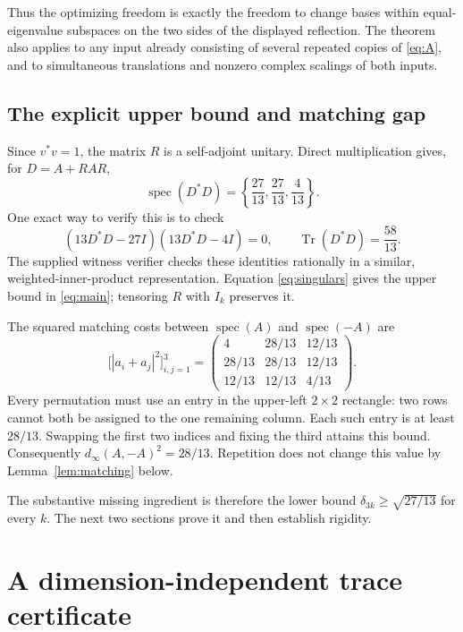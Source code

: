 \documentclass[11pt]{article}
\theoremstyle{definition}\newtheorem{definition}[theorem]{Definition}
\theoremstyle{remark}\newtheorem{remark}[theorem]{Remark}
\newcommand{\Tr}{\operatorname{Tr}}
\newcommand{\spec}{\operatorname{spec}}
\newcommand{\dd}{\delta}
\newcommand{\dm}{d_\infty}
\begin{document}
Thus the optimizing freedom is exactly the freedom to change bases within equal-eigenvalue subspaces on the two sides of the displayed reflection. The theorem also applies to any input already consisting of several repeated copies of \eqref{eq:A}, and to simultaneous translations and nonzero complex scalings of both inputs.

\subsection{The explicit upper bound and matching gap}
Since $v^*v=1$, the matrix $R$ is a self-adjoint unitary. Direct multiplication gives, for $D=A+RAR$,
\begin{equation}\label{eq:singulars}
 \spec(D^*D)=\left\{\frac{27}{13},\frac{27}{13},\frac4{13}\right\}.
\end{equation}
One exact way to verify this is to check
\[
 (13D^*D-27I)(13D^*D-4I)=0,\qquad
 \Tr(D^*D)=\frac{58}{13}.
\]
The supplied witness verifier checks these identities rationally in a similar, weighted-inner-product representation. Equation \eqref{eq:singulars} gives the upper bound in \eqref{eq:main}; tensoring $R$ with $I_k$ preserves it.

The squared matching costs between $\spec(A)$ and $\spec(-A)$ are
\begin{equation}\label{eq:costmatrix}
 \bigl[|a_i+a_j|^2\bigr]_{i,j=1}^3=
 \begin{pmatrix}
 4&28/13&12/13\\
 28/13&28/13&12/13\\
 12/13&12/13&4/13
 \end{pmatrix}.
\end{equation}
Every permutation must use an entry in the upper-left $2\times2$ rectangle: two rows cannot both be assigned to the one remaining column. Each such entry is at least $28/13$. Swapping the first two indices and fixing the third attains this bound. Consequently $\dm(A,-A)^2=28/13$. Repetition does not change this value by Lemma~\ref{lem:matching} below.

The substantive missing ingredient is therefore the lower bound $\dd_{3k}\ge\sqrt{27/13}$ for every $k$. The next two sections prove it and then establish rigidity.

\section{A dimension-independent trace certificate}
\end{document}
